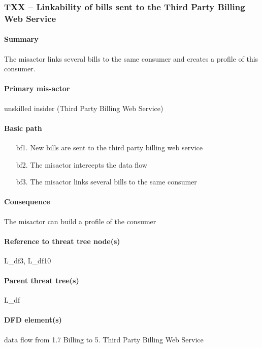 \subsubsection{TXX -- Linkability of bills sent to the Third Party Billing Web
Service}
\paragraph{Summary} The misactor links several bills to the same consumer and
creates a profile of this consumer. 

\paragraph{Primary mis-actor} unskilled insider (Third Party Billing Web
Service)

\paragraph{Basic path}
\begin{enumerate}
	\item[bf1.] New bills are sent to the third party billing web service
	\item[bf2.] The misactor intercepts the data flow
	\item[bf3.] The misactor links several bills to the same consumer
\end{enumerate}

\paragraph{Consequence} The misactor can build a profile of the consumer

\paragraph{Reference to threat tree node(s)} L_df3, L_df10

\paragraph{Parent threat tree(s)} L_df

\paragraph{DFD element(s)} data flow from 1.7 Billing to 5. Third Party Billing
Web Service

